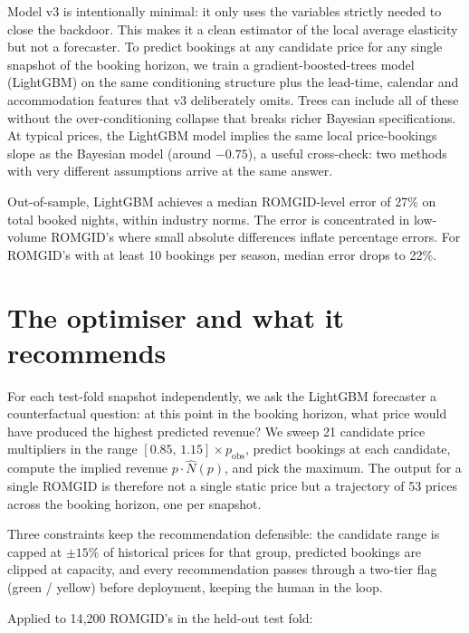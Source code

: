 \documentclass[11pt,a4paper]{article}
\begin{document}
Model v3 is intentionally minimal: it only uses the variables strictly needed to close the backdoor. This makes it a clean estimator of the local average elasticity but not a forecaster. To predict bookings at any candidate price for any single snapshot of the booking horizon, we train a gradient-boosted-trees model (LightGBM) on the same conditioning structure plus the lead-time, calendar and accommodation features that v3 deliberately omits. Trees can include all of these without the over-conditioning collapse that breaks richer Bayesian specifications. At typical prices, the LightGBM model implies the same local price-bookings slope as the Bayesian model (around $-0.75$), a useful cross-check: two methods with very different assumptions arrive at the same answer.

Out-of-sample, LightGBM achieves a median ROMGID-level error of 27\% on total booked nights, within industry norms. The error is concentrated in low-volume ROMGID's where small absolute differences inflate percentage errors. For ROMGID's with at least 10 bookings per season, median error drops to 22\%.

\section{The optimiser and what it recommends}

For each test-fold snapshot independently, we ask the LightGBM forecaster a counterfactual question: at this point in the booking horizon, what price would have produced the highest predicted revenue? We sweep 21 candidate price multipliers in the range $[0.85,\, 1.15] \times p_{\mathrm{obs}}$, predict bookings at each candidate, compute the implied revenue $p \cdot \hat{N}(p)$, and pick the maximum. The output for a single ROMGID is therefore not a single static price but a trajectory of 53 prices across the booking horizon, one per snapshot.

Three constraints keep the recommendation defensible: the candidate range is capped at $\pm 15\%$ of historical prices for that group, predicted bookings are clipped at capacity, and every recommendation passes through a two-tier flag (green / yellow) before deployment, keeping the human in the loop.

\newpage Applied to 14{,}200 ROMGID's in the held-out test fold:
\end{document}
